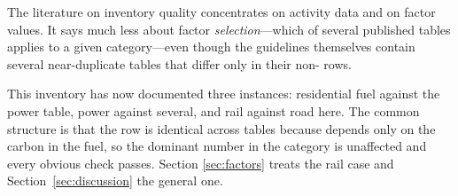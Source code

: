 The literature on inventory quality concentrates on activity data and on factor values. It
says much less about factor \emph{selection}---which of several published tables applies to a
given category---even though the guidelines themselves contain several near-duplicate tables
that differ only in their non-\COtwo{} rows.

This inventory has now documented three instances: residential fuel against the power table,
power against several, and rail against road here. The common structure is that the \COtwo{}
row is identical across tables because \COtwo{} depends only on the carbon in the fuel, so the
dominant number in the category is unaffected and every obvious check passes. Section
\ref{sec:factors} treats the rail case and Section~\ref{sec:discussion} the general one.
